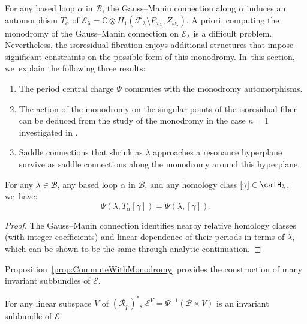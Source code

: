 For any based loop $\alpha$ in $\mathcal{B}$, the Gauss--Manin connection along $\alpha$ induces an automorphism
$T_{\alpha}$ of $\mathcal{E}_{\lambda} =\mathbb{C} \otimes
H_{1}(\overline{\mathcal{F}}_{\lambda} \setminus P_{\omega_{\lambda}}, Z_{\omega_{\lambda}})$. A priori, computing the monodromy of the Gauss--Manin connection on $\mathcal{E}_\lambda$ is a difficult problem. Nevertheless, the isoresidual fibration enjoys additional structures that impose significant constraints on the possible form of this monodromy. In~this section, we~explain the following three results:
\begin{enumerate}
\item The period central charge $\Psi$ commutes with the monodromy automorphisms.
\item The action of the monodromy on the singular points of the isoresidual fiber can be deduced from the study of the monodromy in the case $n=1$ investigated in \cite[\S 5]{GeTaIso}.
\item Saddle connections that shrink as $\lambda$ approaches a resonance hyperplane survive as saddle connections along the monodromy around this hyperplane.
\end{enumerate}

\label{subsub:commute}

\begin{prop}\label{prop:CommuteWithMonodromy}
For any $\lambda \in \mathcal{B}$, any based loop $\alpha$ in $\mathcal{B}$, and any homology class $[\gamma] \in \calH_{\lambda}$, we~have:
\[
\Psi(\lambda,T_{\alpha}[\gamma]) = \Psi(\lambda,[\gamma]).
\]
\end{prop}

\begin{proof}
The Gauss--Manin connection identifies nearby relative homology classes (with integer coefficients) and linear dependence of their periods in terms of $\lambda$, which can be shown to be the same through analytic continuation.
\end{proof}

Proposition~\ref{prop:CommuteWithMonodromy} provides the construction of many invariant subbundles of $\mathcal{E}$.

\begin{cor}\label{cor:InvariantSubbundle}
For any linear subspace $V$ of $(\mathcal{R}_{p})^{\ast}$, $\mathcal{E}^{V}=\Psi^{-1}(\mathcal{B} \times V)$ is an invariant subbundle of $\mathcal{E}$.
\end{cor}

